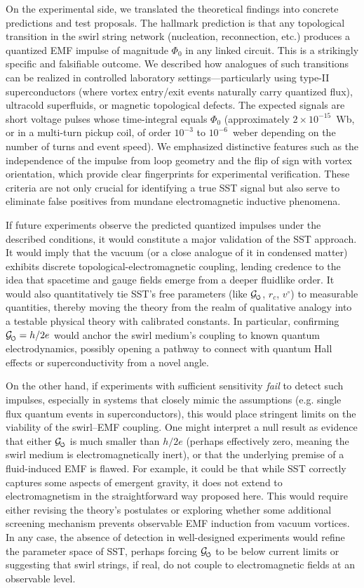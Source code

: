 \documentclass[12pt]{article}
\DeclareRobustCommand{\swirlarrow}{
\mathchoice{\mkern-2mu\scriptstyle\boldsymbol{\circlearrowleft}}%
{\mkern-2mu\scriptstyle\boldsymbol{\circlearrowleft}}%
{\mkern-2mu\scriptscriptstyle\boldsymbol{\circlearrowleft}}%
{\mkern-2mu\scriptscriptstyle\boldsymbol{\circlearrowleft}}
}%
\newcommand{\Gswirl}{\mathcal{G}_{\swirlarrow}}
\begin{document}
On the experimental side, we translated the theoretical findings into concrete predictions and test proposals. The hallmark prediction is that any topological transition in the swirl string network (nucleation, reconnection, etc.) produces a quantized EMF impulse of magnitude $\Phi_{0}$ in any linked circuit. This is a strikingly specific and falsifiable outcome. We described how analogues of such transitions can be realized in controlled laboratory settings—particularly using type-II superconductors (where vortex entry/exit events naturally carry quantized flux), ultracold superfluids, or magnetic topological defects. The expected signals are short voltage pulses whose time-integral equals $\Phi_{0}$ (approximately $2\times10^{-15}$~Wb, or in a multi-turn pickup coil, of order $10^{-3}$ to $10^{-6}$~weber depending on the number of turns and event speed). We emphasized distinctive features such as the independence of the impulse from loop geometry and the flip of sign with vortex orientation, which provide clear fingerprints for experimental verification. These criteria are not only crucial for identifying a true SST signal but also serve to eliminate false positives from mundane electromagnetic inductive phenomena.


If future experiments observe the predicted quantized impulses under the described conditions, it would constitute a major validation of the SST approach. It would imply that the vacuum (or a close analogue of it in condensed matter) exhibits discrete topological-electromagnetic coupling, lending credence to the idea that spacetime and gauge fields emerge from a deeper fluidlike order. It would also quantitatively tie SST’s free parameters (like $\Gswirl$, $r_c$, $v^{\circ}$) to measurable quantities, thereby moving the theory from the realm of qualitative analogy into a testable physical theory with calibrated constants. In particular, confirming $\Gswirl = h/2e$ would anchor the swirl medium’s coupling to known quantum electrodynamics, possibly opening a pathway to connect with quantum Hall effects or superconductivity from a novel angle.


On the other hand, if experiments with sufficient sensitivity \emph{fail} to detect such impulses, especially in systems that closely mimic the assumptions (e.g. single flux quantum events in superconductors), this would place stringent limits on the viability of the swirl–EMF coupling. One might interpret a null result as evidence that either $\Gswirl$ is much smaller than $h/2e$ (perhaps effectively zero, meaning the swirl medium is electromagnetically inert), or that the underlying premise of a fluid-induced EMF is flawed. For example, it could be that while SST correctly captures some aspects of emergent gravity, it does not extend to electromagnetism in the straightforward way proposed here. This would require either revising the theory’s postulates or exploring whether some additional screening mechanism prevents observable EMF induction from vacuum vortices. In any case, the absence of detection in well-designed experiments would refine the parameter space of SST, perhaps forcing $\Gswirl$ to be below current limits or suggesting that swirl strings, if real, do not couple to electromagnetic fields at an observable level.
\end{document}
